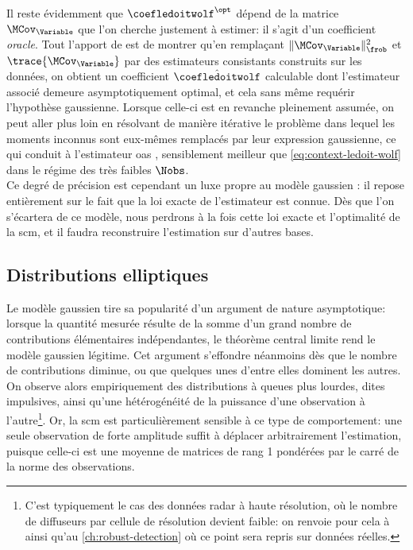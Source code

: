 Il reste évidemment que $\coefledoitwolf^\opt$ dépend de la matrice $\MCov_\Variable$ que l'on cherche justement à estimer: il s'agit d'un coefficient \emph{oracle}. Tout l'apport de  est de montrer qu'en remplaçant $\|\MCov_\Variable\|_\frob^2$ et $\trace{\MCov_\Variable}$ par des estimateurs consistants construits sur les données, on obtient un coefficient $\hat{\coefledoitwolf}$ calculable dont l'estimateur associé demeure asymptotiquement optimal, et cela sans même requérir l'hypothèse gaussienne. Lorsque celle-ci est en revanche pleinement assumée, on peut aller plus loin en résolvant de manière itérative le problème dans lequel les moments inconnus sont eux-mêmes remplacés par leur expression gaussienne, ce qui conduit à l'estimateur oas , sensiblement meilleur que \cref{eq:context-ledoit-wolf} dans le régime des très faibles $\Nobs$. \\

Ce degré de précision est cependant un luxe propre au modèle gaussien : il repose entièrement sur le fait que la loi exacte de l'estimateur est connue. Dès que l'on s'écartera de ce modèle, nous perdrons à la fois cette loi exacte et l'optimalité de la scm, et il faudra reconstruire l'estimation sur d'autres bases. \\


\subsection{Distributions elliptiques}
\label{subsec:context-distributions-elliptical}

Le modèle gaussien tire sa popularité d'un argument de nature asymptotique: lorsque la quantité mesurée résulte de la somme d'un grand nombre de contributions élémentaires indépendantes, le théorème central limite rend le modèle gaussien légitime. Cet argument s'effondre néanmoins dès que le nombre de contributions diminue, ou que quelques unes d'entre elles dominent les autres. On observe alors empiriquement des distributions à queues plus lourdes, dites impulsives, ainsi qu'une hétérogénéité de la puissance d'une observation à l'autre\footnote{C'est typiquement le cas des données radar à haute résolution, où le nombre de diffuseurs par cellule de résolution devient faible: on renvoie pour cela à  ainsi qu'au \cref{ch:robust-detection} où ce point sera repris sur données réelles.}. Or, la scm est particulièrement sensible à ce type de comportement: une seule observation de forte amplitude suffit à déplacer arbitrairement l'estimation, puisque celle-ci est une moyenne de matrices de rang 1 pondérées par le carré de la norme des observations. \\

